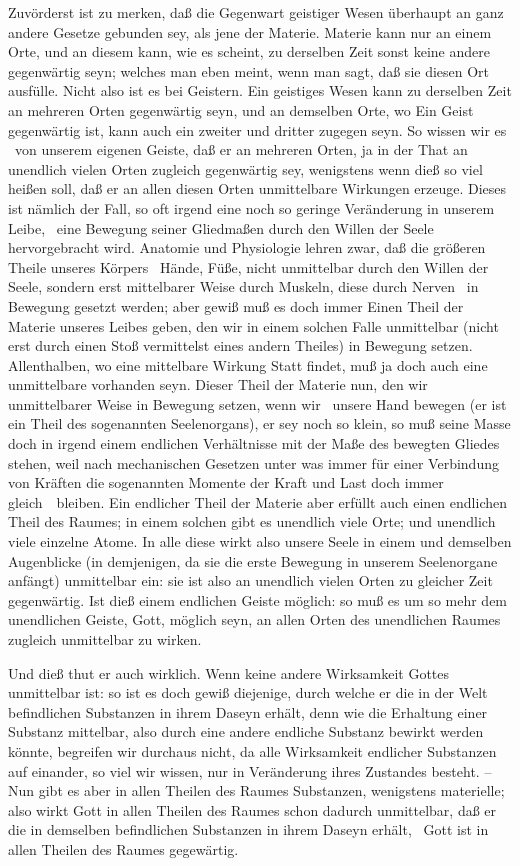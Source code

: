 \begin{aufza}
\item Zuvörderst ist zu merken, daß die Gegenwart geistiger Wesen überhaupt an ganz andere Gesetze gebunden sey, als jene der Materie. Materie kann nur an einem Orte, und an diesem kann, wie es scheint, zu derselben Zeit sonst keine andere gegenwärtig seyn; welches man eben meint, wenn man sagt, daß sie diesen Ort ausfülle. Nicht also ist es bei Geistern. Ein geistiges Wesen kann zu derselben Zeit an mehreren Orten gegenwärtig seyn, und an demselben Orte, wo Ein Geist gegenwärtig ist, kann auch ein zweiter und dritter zugegen seyn. So wissen wir es \zB\ von unserem eigenen Geiste, daß er an mehreren Orten, ja in der That an unendlich vielen Orten zugleich gegenwärtig sey, wenigstens wenn dieß so viel heißen soll, daß er an allen diesen Orten unmittelbare Wirkungen erzeuge. Dieses ist nämlich der Fall, so oft irgend eine noch so geringe Veränderung in unserem Leibe, \zB\ eine Bewegung seiner Gliedmaßen durch den Willen der Seele hervorgebracht wird. Anatomie und Physiologie lehren zwar, daß die größeren Theile unseres Körpers \zB\ Hände, Füße, nicht unmittelbar durch den Willen der Seele, sondern erst mittelbarer Weise durch Muskeln, diese durch Nerven \usw\ in Bewegung gesetzt werden; aber gewiß muß es doch immer Einen Theil der Materie unseres Leibes geben, den wir in einem solchen Falle unmittelbar (nicht erst durch einen Stoß vermittelst eines andern Theiles) in Bewegung setzen. Allenthalben, wo eine mittelbare Wirkung Statt findet, muß ja doch auch eine unmittelbare vorhanden seyn. Dieser Theil der Materie nun, den wir unmittelbarer Weise in Bewegung setzen, wenn wir \zB\ unsere Hand bewegen (er ist ein Theil des sogenannten Seelenorgans), er sey noch so klein, so muß seine Masse doch in irgend einem endlichen Verhältnisse mit der Maße des bewegten Gliedes stehen, weil nach mechanischen Gesetzen unter was immer für einer Verbindung von Kräften die sogenannten Momente der Kraft und Last doch immer gleich~\ bleiben. Ein endlicher Theil der Materie aber erfüllt auch einen endlichen Theil des Raumes; in einem solchen gibt es unendlich viele Orte; und unendlich viele einzelne Atome. In alle diese wirkt also unsere Seele in einem und demselben Augenblicke (in demjenigen, da sie die erste Bewegung in unserem Seelenorgane anfängt) unmittelbar ein: sie ist also an unendlich vielen Orten zu gleicher Zeit gegenwärtig. Ist dieß einem endlichen Geiste möglich: so muß es um so mehr dem unendlichen Geiste, Gott, möglich seyn, an allen Orten des unendlichen Raumes zugleich unmittelbar zu wirken.
\item Und dieß thut er auch wirklich. Wenn keine andere Wirksamkeit Gottes unmittelbar ist: so ist es doch gewiß diejenige, durch welche er die in der Welt befindlichen Substanzen in ihrem Daseyn erhält, denn wie die Erhaltung einer Substanz mittelbar, also durch eine andere endliche Substanz bewirkt werden könnte, begreifen wir durchaus nicht, da alle Wirksamkeit endlicher Substanzen auf einander, so viel wir wissen, nur in Veränderung ihres Zustandes besteht. -- Nun gibt es aber in allen Theilen des Raumes Substanzen, wenigstens materielle; also wirkt Gott in allen Theilen des Raumes schon dadurch unmittelbar, daß er die in demselben befindlichen Substanzen in ihrem Daseyn erhält, \dh\ Gott ist in allen Theilen des Raumes gegewärtig.

\end{aufza}
